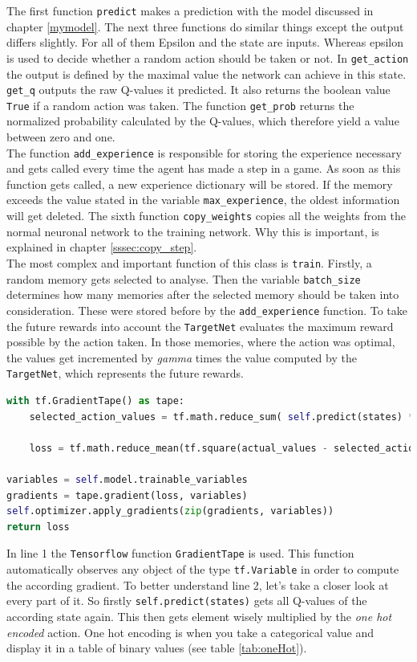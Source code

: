 \documentclass[12pt]{article}
\begin{document}
The first function \lstinline{predict} makes a prediction with the model discussed in chapter \ref{mymodel}. The next three functions do similar things except the output differs slightly. For all of them  Epsilon and the state are inputs. Whereas epsilon is used to decide whether a random action should be taken or not. In \lstinline{get_action} the output is defined by the maximal value the network can achieve in this state.  \lstinline{get_q} outputs the raw Q-values it predicted. It also returns the boolean value \lstinline{True} if a random action was taken. The function \lstinline{get_prob}  returns the normalized probability calculated by the Q-values, which therefore yield a value between zero and one. \\ The function \lstinline{add_experience} is responsible for storing the experience necessary and gets called every time the agent has made a step in a game. As soon as this function gets called, a new experience dictionary will be stored. If the memory exceeds the value stated in the variable \lstinline{max_experience}, the oldest information will get deleted. The sixth function \lstinline{copy_weights} copies all the weights from the normal neuronal network to the training network. Why this is important, is explained in chapter \ref{sssec:copy_step}.\\
The most complex and important function of this class is \lstinline{train}. Firstly, a random memory gets selected to analyse. Then the variable \lstinline{batch_size} determines how many memories after the selected memory should be taken into consideration. These were stored before by the \lstinline{add_experience} function. To take the future rewards into account the \lstinline{TargetNet} evaluates the maximum reward possible by the action taken. In those memories, where the action was optimal, the values get incremented by \textit{gamma} times the value computed by the \lstinline{TargetNet}, which represents the future rewards. 
\begin{lstlisting}[language=Python, caption = Example - Optimization of the network]
with tf.GradientTape() as tape:
    selected_action_values = tf.math.reduce_sum( self.predict(states) * tf.one_hot(actions, self.num_actions), axis=1) 

    loss = tf.math.reduce_mean(tf.square(actual_values - selected_action_values)) 
    
variables = self.model.trainable_variables
gradients = tape.gradient(loss, variables)
self.optimizer.apply_gradients(zip(gradients, variables)) 
return loss
\end{lstlisting}
In line 1 the \lstinline{Tensorflow} function \lstinline{GradientTape} is used. This function automatically observes any object of the type \lstinline{tf.Variable} in order to compute the according gradient. \cite{tf.grad} To better understand line 2, let's take a closer look at every part of it. So firstly \lstinline{self.predict(states)} gets all Q-values of the according state again. This then gets element wisely multiplied by the \textit{one hot encoded} action. One hot encoding is when you take a categorical value and display it in a table of binary values (see table \ref{tab:oneHot}). 
\end{document}
